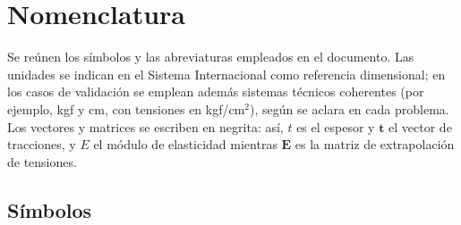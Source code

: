 
\chapter*{Nomenclatura}

Se reúnen los símbolos y las abreviaturas empleados en el documento. Las
unidades se indican en el Sistema Internacional como referencia dimensional;
en los casos de validación se emplean además sistemas técnicos coherentes
(por ejemplo, kgf y cm, con tensiones en kgf/cm$^2$), según se aclara en cada problema.
Los vectores y matrices se escriben en negrita: así, $t$ es el espesor y $\bm{t}$ el
vector de tracciones, y $E$ el módulo de elasticidad mientras $\bm{E}$ es la matriz de
extrapolación de tensiones.

\section*{Símbolos}

